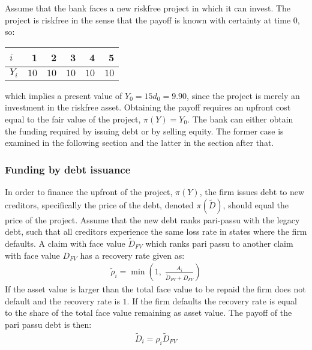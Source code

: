 \documentclass[../main.tex]{subfiles}
\begin{document}
        Assume that the bank faces a new riskfree project in which it can invest. The project is riskfree in the sense that the payoff is known with certainty at time 0, so:
            \begin{table}[H]
                \centering
                \begin{tabular}{l|rrrrr}
                    $i$ & 1 & 2 & 3 & 4 & 5 \\
                    \hline
                    $Y_{i}$ & $10$ & $10$ & $10$ & $10$ & $10$
                \end{tabular}
            \end{table}
        which implies a present value of $Y_{0} = 15d_{0} = 9.90$, since the project is merely an investment in the riskfree asset. Obtaining the payoff requires an upfront cost equal to the fair value of the project, $\pi(Y) = Y_{0}$. The bank can either obtain the funding required by issuing debt or by selling equity. The former case is examined in the following section and the latter in the section after that.

    \subsubsection{Funding by debt issuance}
        In order to finance the upfront of the project, $\pi(Y)$, the firm issues debt to new creditors, specifically the price of the debt, denoted $\pi(\tilde{D})$, should equal the price of the project. Assume that the new debt ranks pari-passu with the legacy debt, such that all creditors experience the same loss rate in states where the firm defaults. A claim with face value $\tilde{D}_{FV}$ which ranks pari passu to another claim with face value $D_{FV}$ has a recovery rate given as:
            \begin{align}
                \tilde{\rho}_{i} = \min\left(
                    1,\;
                    \frac{A_{i}}{\tilde{D}_{FV} + D_{FV}}
                \right)
            \end{align}
        If the asset value is larger than the total face value to be repaid the firm does not default and the recovery rate is $1$. If the firm defaults the recovery rate is equal to the share of the total face value remaining as asset value. The payoff of the pari passu debt is then:
            \begin{align}
                \tilde{D}_{i}
                    = \rho_{i}\tilde{D}_{FV}
            \end{align}
\end{document}
